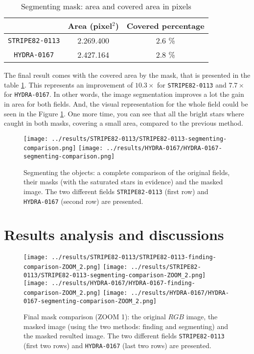 \documentclass{article}
\begin{document}
\begin{table}[h!]
  \centering
  \caption{Segmenting mask: area and covered area in pixels}
  \begin{tabular}{c|c|c}
    \cline{2-3}
     & {\cellcolor{orange!20} \bf Area (pixel$^2$)} & {\cellcolor{orange!20} \bf Covered percentage} \\
    \hline
    {\cellcolor{blue!20}\texttt{STRIPE82-0113}} & 2.269.400 & 2.6 \%\\
    \hline
    {\cellcolor{blue!20}\texttt{HYDRA-0167}} & 2.427.164 & 2.8 \%\\
    \hline
  \end{tabular}
  \label{tb:segmenting_masks}
\end{table}

The final result comes with the covered area by the mask, that is presented in the table \ref{tb:segmenting_masks}. This represents an improvement of $10.3 \times$ for \texttt{STRIPE82-0113} and $7.7 \times$  for \texttt{HYDRA-0167}. In other words, the image segmentation improves a lot the gain in area for both fields. And, the visual representation for the whole field could be seen in the Figure \ref{fig:complete_mask_segmenting}. One more time, you can see that all the bright stars where caught in both masks, covering a small area, compared to the previous method.

\begin{figure}[h!]
  \centering
  \texttt{[image: ../results/STRIPE82-0113/STRIPE82-0113-segmenting-comparison.png]}
  \texttt{[image: ../results/HYDRA-0167/HYDRA-0167-segmenting-comparison.png]}
  \caption{Segmenting the objects: a complete comparison of the original fields, their masks (with the saturated stars in evidence) and the masked image. The two different fields \texttt{STRIPE82-0113} (first row) and \texttt{HYDRA-0167} (second row) are presented.}
  \label{fig:complete_mask_segmenting}
\end{figure}

\section{Results analysis and discussions}
\label{sec:res_and_disc}

\begin{figure}[h!]
  \centering
  \texttt{[image: ../results/STRIPE82-0113/STRIPE82-0113-finding-comparison-ZOOM\_2.png]}
  \texttt{[image: ../results/STRIPE82-0113/STRIPE82-0113-segmenting-comparison-ZOOM\_2.png]}
  \texttt{[image: ../results/HYDRA-0167/HYDRA-0167-finding-comparison-ZOOM\_2.png]}
  \texttt{[image: ../results/HYDRA-0167/HYDRA-0167-segmenting-comparison-ZOOM\_2.png]}
  \caption{Final mask comparison (ZOOM 1): the original $RGB$ image, the masked image (using the two methods: finding and segmenting) and the masked resulted image. The two different fields \texttt{STRIPE82-0113} (first two rows) and \texttt{HYDRA-0167} (last two rows) are presented.}
  \label{fig:final_mask_comparison-Z1}
\end{figure}
\end{document}
